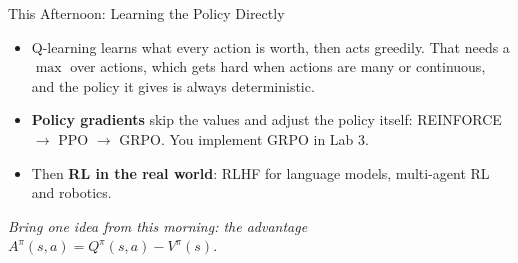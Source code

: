 \begin{frame}{This Afternoon: Learning the Policy Directly}
\begin{itemize}\itemsep0.7em
    \item Q-learning learns what every action is worth, then acts greedily. That needs a
          $\max$ over actions, which gets hard when actions are many or continuous, and
          the policy it gives is always deterministic.
    \item \textbf{Policy gradients} skip the values and adjust the policy itself:
          REINFORCE $\rightarrow$ PPO $\rightarrow$ GRPO. You implement GRPO in Lab 3.
    \item Then \textbf{RL in the real world}: RLHF for language models, multi-agent RL and
          robotics.
\end{itemize}
\vfill
\begin{center}
\itshape Bring one idea from this morning: the advantage
$A^{\pi}(s,a) = Q^{\pi}(s,a) - V^{\pi}(s)$.
\end{center}
\end{frame}
